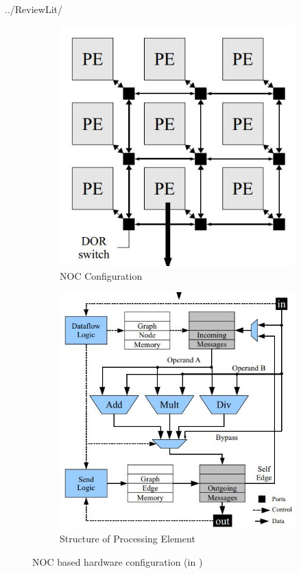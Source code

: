 ../ReviewLit/
\begin{figure}[H]
    \centering
    \begin{subfigure}[b]{0.5\textwidth}
        \centering
        \includegraphics[width = 0.95\linewidth]{./ReviewLit/kapreArch1.JPG}
        \caption{NOC Configuration}
        \label{fig:Intro:KapreNOC}
    \end{subfigure}%
    \begin{subfigure}[b]{0.5\textwidth}
        \centering
        \includegraphics[width = 0.95\linewidth]{./ReviewLit/kapreArch2.JPG}
        \caption{Structure of Processing Element}
        \label{fig:Intro:KaprePE}
    \end{subfigure}
    \caption{NOC based hardware configuration (in \cite{Kapre})}
    \label{fig:Into:kapre}
\end{figure}

